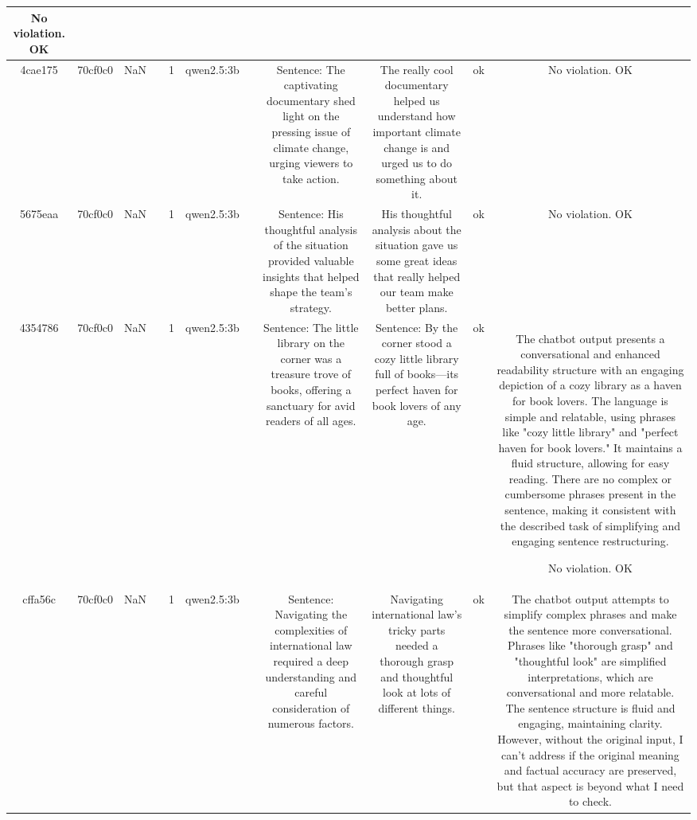 \begin{table}[h!]
\begin{tabular}{|c|c|c|c|c|c|c|c|c|c|c|}
No violation.
OK\\
\hline
4cae175 & 70cf0c0 & NaN &  & 1 & qwen2.5:3b &  & Sentence: The captivating documentary shed light on the pressing issue of climate change, urging viewers to take action. & The really cool documentary helped us understand how important climate change is and urged us to do something about it. & ok & No violation.
OK\\
\hline
5675eaa & 70cf0c0 & NaN &  & 1 & qwen2.5:3b &  & Sentence: His thoughtful analysis of the situation provided valuable insights that helped shape the team's strategy. & His thoughtful analysis about the situation gave us some great ideas that really helped our team make better plans. & ok & No violation.
OK\\
\hline
4354786 & 70cf0c0 & NaN &  & 1 & qwen2.5:3b &  & Sentence: The little library on the corner was a treasure trove of books, offering a sanctuary for avid readers of all ages. & Sentence: By the corner stood a cozy little library full of books—its perfect haven for book lovers of any age. & ok & The chatbot output presents a conversational and enhanced readability structure with an engaging depiction of a cozy library as a haven for book lovers. The language is simple and relatable, using phrases like "cozy little library" and "perfect haven for book lovers." It maintains a fluid structure, allowing for easy reading. There are no complex or cumbersome phrases present in the sentence, making it consistent with the described task of simplifying and engaging sentence restructuring.  

No violation.
OK\\
\hline
cffa56c & 70cf0c0 & NaN &  & 1 & qwen2.5:3b &  & Sentence: Navigating the complexities of international law required a deep understanding and careful consideration of numerous factors. & Navigating international law's tricky parts needed a thorough grasp and thoughtful look at lots of different things. & ok & The chatbot output attempts to simplify complex phrases and make the sentence more conversational. Phrases like "thorough grasp" and "thoughtful look" are simplified interpretations, which are conversational and more relatable. The sentence structure is fluid and engaging, maintaining clarity. However, without the original input, I can't address if the original meaning and factual accuracy are preserved, but that aspect is beyond what I need to check.


\end{tabular}
\end{table}
